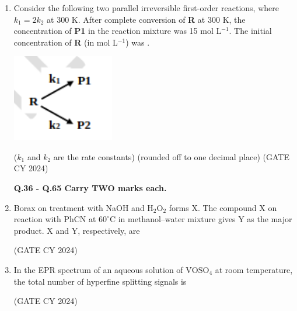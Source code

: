 \documentclass[12pt]{article}
\begin{document}
\begin{enumerate}
\item Consider the following two parallel irreversible first-order reactions, where $k_1 = 2k_2$ at 300 K. After complete conversion of \textbf{R} at 300 K, the concentration of \textbf{P1} in the reaction mixture was 15 mol L$^{-1}$. The initial concentration of \textbf{R} (in mol L$^{-1}$) was \underline{\hspace{2cm}}.  
\begin{center}
\includegraphics[width=0.35\textwidth]{figs/q35.png}
\label{fig:q35}
\end{center}
($k_1$ and $k_2$ are the rate constants)  
(rounded off to one decimal place)  
\hfill (GATE CY 2024)

\textbf{Q.36 - Q.65 Carry TWO marks each.}

\item Borax on treatment with NaOH and H$_2$O$_2$ forms X. The compound X on reaction with PhCN at $60^{\circ}\mathrm{C}$ in methanol–water mixture gives Y as the major product. X and Y, respectively, are
\begin{enumerate}
\end{enumerate}
\hfill (GATE CY 2024)

\item In the EPR spectrum of an aqueous solution of $\mathrm{VOSO_4}$ at room temperature, the total number of hyperfine splitting signals is
\begin{enumerate}
\end{enumerate}
\hfill (GATE CY 2024)


\end{enumerate}
\end{document}
